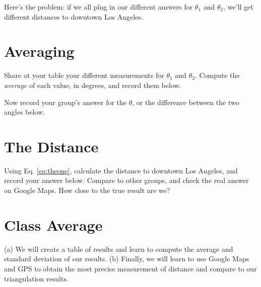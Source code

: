 \documentclass{article}
\begin{document}
Here's the problem: if we all plug in our different answers for $\theta_1$ and $\theta_2$, we'll get different distances to downtown Los Angeles.

\section{Averaging}

Share at your table your different measurements for $\theta_1$ and $\theta_2$.  Compute the \textit{average} of each value, in degrees, and record them below.  \\ \vspace{0.5cm}

Now record your group's answer for the $\theta$, or the difference between the two angles below. \\ \vspace{0.5cm}

\section{The Distance}

Using Eq. \ref{eq:theone}, calculate the distance to downtown Los Angeles, and record your answer below.  Compare to other groups, and check the real answer on Google Maps.  How close to the true result are we?

\section{Class Average}

(a) We will create a table of results and learn to compute the average and standard deviation of our results.  (b) Finally, we will learn to use Google Maps and GPS to obtain the most precise measurement of distance and compare to our triangulation results.
\end{document}

